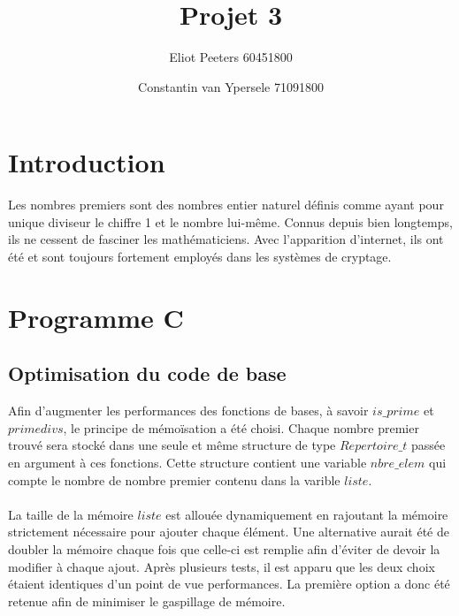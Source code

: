 \documentclass{article}
\title{Projet 3}
\author{Eliot Peeters 60451800}
\author{Constantin van Ypersele 71091800}
\begin{document}
\maketitle

\section{Introduction}
Les nombres premiers sont des nombres entier naturel définis comme ayant pour unique diviseur le chiffre 1 et le nombre lui-même. Connus depuis bien longtemps, ils ne cessent de fasciner les mathématiciens. Avec l'apparition d'internet, ils ont été et sont toujours fortement employés dans les systèmes de cryptage.

\section{Programme C}

\subsection{Optimisation du code de base}
Afin d'augmenter les performances des fonctions de bases, à savoir $is\_prime$ et $primedivs$, le principe de mémoïsation a été choisi. Chaque nombre premier trouvé sera stocké dans une seule et même structure de type $Repertoire\_t$ passée en argument à ces fonctions. Cette structure contient une variable $nbre\_elem$ qui compte le nombre de nombre premier contenu dans la varible $liste$. \\ \\
\danger La taille de la mémoire $liste$ est allouée dynamiquement en rajoutant la mémoire strictement nécessaire pour ajouter chaque élément. Une alternative aurait été de doubler la mémoire chaque fois que celle-ci est remplie afin d'éviter de devoir la modifier à chaque ajout. Après plusieurs tests, il est apparu que les deux choix étaient identiques d'un point de vue performances. La première option a donc été retenue afin de minimiser le gaspillage de mémoire. 
\end{document}
